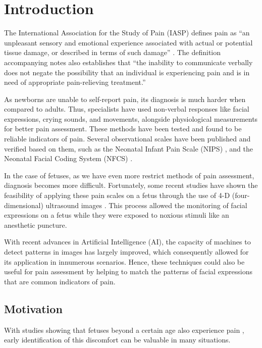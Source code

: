 \chapter{Introduction}

The International Association for the Study of Pain (IASP) defines pain as ``an unpleasant sensory and emotional experience associated with actual or potential tissue damage, or described in terms of such damage'' \citep{merskey1994classification}. The definition accompanying notes also establishes that ``the inability to communicate verbally does not negate the possibility that an individual is experiencing pain and is in need of appropriate pain-relieving treatment.''

As newborns are unable to self-report pain, its diagnosis is much harder when compared to adults. Thus, specialists have used non-verbal responses like facial expressions, crying sounds, and movements, alongside physiological measurements for better pain assessment. These methods have been tested and found to be reliable indicators of pain. Several observational scales have been published and verified based on them, such as the Neonatal Infant Pain Scale (NIPS) \citep{Lawrence1993}, and the Neonatal Facial Coding System (NFCS) \citep{Grunau1998}.

In the case of fetuses, as we have even more restrict methods of pain assessment, diagnosis becomes more difficult. Fortunately, some recent studies have shown the feasibility of applying these pain scales on a fetus through the use of 4-D (four-dimensional) ultrasound images \citep{bernardes2018feasibility}. This process allowed the monitoring of facial expressions on a fetus while they were exposed to noxious stimuli like an anesthetic puncture.

With recent advances in Artificial Intelligence (AI), the capacity of machines to detect patterns in images has largely improved, which consequently allowed for its application in innumerous scenarios. Hence, these techniques could also be useful for pain assessment by helping to match the patterns of facial expressions that are common indicators of pain.

\section{Motivation}

With studies showing that fetuses beyond a certain age also experience pain \citep{Derbyshire2006, Derbyshire2020}, early identification of this discomfort can be valuable in many situations. 

